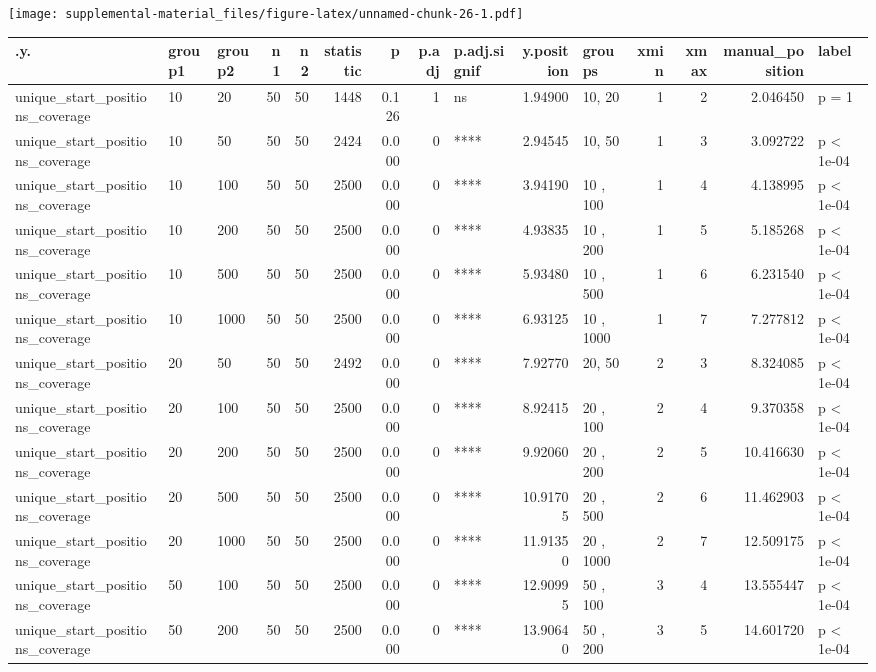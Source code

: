 \documentclass[]{book}
\begin{document}
\texttt{[image: supplemental-material\_files/figure-latex/unnamed-chunk-26-1.pdf]}

\begin{tabular}{l|l|l|r|r|r|r|r|l|r|l|r|r|r|l}
\hline
.y. & group1 & group2 & n1 & n2 & statistic & p & p.adj & p.adj.signif & y.position & groups & xmin & xmax & manual\_position & label\\
\hline
unique\_start\_positions\_coverage & 10 & 20 & 50 & 50 & 1448 & 0.126 & 1 & ns & 1.94900 & 10, 20 & 1 & 2 & 2.046450 & p = 1\\
\hline
unique\_start\_positions\_coverage & 10 & 50 & 50 & 50 & 2424 & 0.000 & 0 & **** & 2.94545 & 10, 50 & 1 & 3 & 3.092722 & p < 1e-04\\
\hline
unique\_start\_positions\_coverage & 10 & 100 & 50 & 50 & 2500 & 0.000 & 0 & **** & 3.94190 & 10 , 100 & 1 & 4 & 4.138995 & p < 1e-04\\
\hline
unique\_start\_positions\_coverage & 10 & 200 & 50 & 50 & 2500 & 0.000 & 0 & **** & 4.93835 & 10 , 200 & 1 & 5 & 5.185268 & p < 1e-04\\
\hline
unique\_start\_positions\_coverage & 10 & 500 & 50 & 50 & 2500 & 0.000 & 0 & **** & 5.93480 & 10 , 500 & 1 & 6 & 6.231540 & p < 1e-04\\
\hline
unique\_start\_positions\_coverage & 10 & 1000 & 50 & 50 & 2500 & 0.000 & 0 & **** & 6.93125 & 10  , 1000 & 1 & 7 & 7.277812 & p < 1e-04\\
\hline
unique\_start\_positions\_coverage & 20 & 50 & 50 & 50 & 2492 & 0.000 & 0 & **** & 7.92770 & 20, 50 & 2 & 3 & 8.324085 & p < 1e-04\\
\hline
unique\_start\_positions\_coverage & 20 & 100 & 50 & 50 & 2500 & 0.000 & 0 & **** & 8.92415 & 20 , 100 & 2 & 4 & 9.370358 & p < 1e-04\\
\hline
unique\_start\_positions\_coverage & 20 & 200 & 50 & 50 & 2500 & 0.000 & 0 & **** & 9.92060 & 20 , 200 & 2 & 5 & 10.416630 & p < 1e-04\\
\hline
unique\_start\_positions\_coverage & 20 & 500 & 50 & 50 & 2500 & 0.000 & 0 & **** & 10.91705 & 20 , 500 & 2 & 6 & 11.462903 & p < 1e-04\\
\hline
unique\_start\_positions\_coverage & 20 & 1000 & 50 & 50 & 2500 & 0.000 & 0 & **** & 11.91350 & 20  , 1000 & 2 & 7 & 12.509175 & p < 1e-04\\
\hline
unique\_start\_positions\_coverage & 50 & 100 & 50 & 50 & 2500 & 0.000 & 0 & **** & 12.90995 & 50 , 100 & 3 & 4 & 13.555447 & p < 1e-04\\
\hline
unique\_start\_positions\_coverage & 50 & 200 & 50 & 50 & 2500 & 0.000 & 0 & **** & 13.90640 & 50 , 200 & 3 & 5 & 14.601720 & p < 1e-04\\

\end{tabular}
\end{document}
